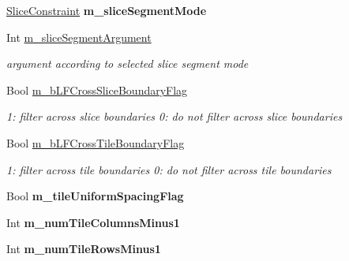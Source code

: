\begin{DoxyCompactItemize}
\mbox{\label{class_t_app_enc_cfg_a7e5ae184647437c87172a25fcd4c37ef}} 
\hyperlink{_type_def_8h_add7235a66eb4e5f93c692468c39dde44}{Slice\+Constraint} {\bfseries m\+\_\+slice\+Segment\+Mode}
\item 
\mbox{\label{class_t_app_enc_cfg_a66c8053f66ceb163df0dd72fab37eebd}} 
Int \hyperlink{class_t_app_enc_cfg_a66c8053f66ceb163df0dd72fab37eebd}{m\+\_\+slice\+Segment\+Argument}
\begin{DoxyCompactList}\small\item\em argument according to selected slice segment mode \end{DoxyCompactList}\item 
\mbox{\label{class_t_app_enc_cfg_a8c247f600d2b343cd075f6fe2e11746e}} 
Bool \hyperlink{class_t_app_enc_cfg_a8c247f600d2b343cd075f6fe2e11746e}{m\+\_\+b\+L\+F\+Cross\+Slice\+Boundary\+Flag}
\begin{DoxyCompactList}\small\item\em 1\+: filter across slice boundaries 0\+: do not filter across slice boundaries \end{DoxyCompactList}\item 
\mbox{\label{class_t_app_enc_cfg_a739529fc31ba902de321d11a447c9818}} 
Bool \hyperlink{class_t_app_enc_cfg_a739529fc31ba902de321d11a447c9818}{m\+\_\+b\+L\+F\+Cross\+Tile\+Boundary\+Flag}
\begin{DoxyCompactList}\small\item\em 1\+: filter across tile boundaries 0\+: do not filter across tile boundaries \end{DoxyCompactList}\item 
\mbox{\label{class_t_app_enc_cfg_aa09f825eee1f5fdf61f5736c52d96316}} 
Bool {\bfseries m\+\_\+tile\+Uniform\+Spacing\+Flag}
\item 
\mbox{\label{class_t_app_enc_cfg_a9dc2d8594a0e3a1b336375efa258c69b}} 
Int {\bfseries m\+\_\+num\+Tile\+Columns\+Minus1}
\item 
\mbox{\label{class_t_app_enc_cfg_a3340348296cc582cd35612b8b40edbfb}} 
Int {\bfseries m\+\_\+num\+Tile\+Rows\+Minus1}
\item 

\end{DoxyCompactItemize}
